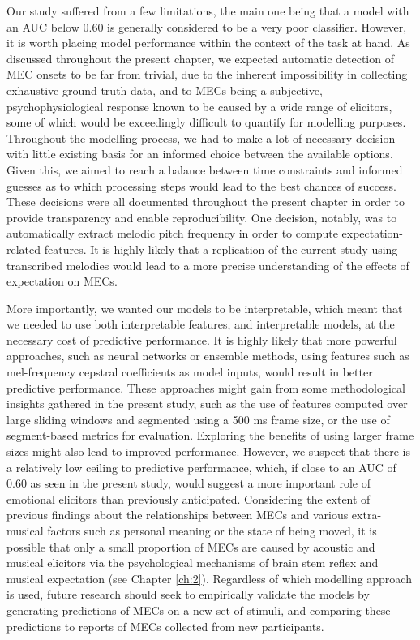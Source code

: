 Our study suffered from a few limitations, the main one being that a model with an AUC below 0.60 is generally considered to be a very poor classifier. However, it is worth placing model performance within the context of the task at hand. As discussed throughout the present chapter, we expected automatic detection of MEC onsets to be far from trivial, due to the inherent impossibility in collecting exhaustive ground truth data, and to MECs being a subjective, psychophysiological response known to be caused by a wide range of elicitors, some of which would be exceedingly difficult to quantify for modelling purposes. Throughout the modelling process, we had to make a lot of necessary decision with little existing basis for an informed choice between the available options. Given this, we aimed to reach a balance between time constraints and informed guesses as to which processing steps would lead to the best chances of success. These decisions were all documented throughout the present chapter in order to provide transparency and enable reproducibility. One decision, notably, was to automatically extract melodic pitch frequency in order to compute expectation-related features. It is highly likely that a replication of the current study using transcribed melodies would lead to a more precise understanding of the effects of expectation on MECs.

More importantly, we wanted our models to be interpretable, which meant that we needed to use both interpretable features, and interpretable models, at the necessary cost of predictive performance. It is highly likely that more powerful approaches, such as neural networks or ensemble methods, using features such as mel-frequency cepstral coefficients as model inputs, would result in better predictive performance. These approaches might gain from some methodological insights gathered in the present study, such as the use of features computed over large sliding windows and segmented using a 500 ms frame size, or the use of segment-based metrics for evaluation. Exploring the benefits of using larger frame sizes might also lead to improved performance. However, we suspect that there is a relatively low ceiling to predictive performance, which, if close to an AUC of 0.60 as seen in the present study, would suggest a more important role of emotional elicitors than previously anticipated. Considering the extent of previous findings about the relationships between MECs and various extra-musical factors such as personal meaning or the state of being moved, it is possible that only a small proportion of MECs are caused by acoustic and musical elicitors via the psychological mechanisms of brain stem reflex and musical expectation (see Chapter \ref{ch:2}). Regardless of which modelling approach is used, future research should seek to empirically validate the models by generating predictions of MECs on a new set of stimuli, and comparing these predictions to reports of MECs collected from new participants.

